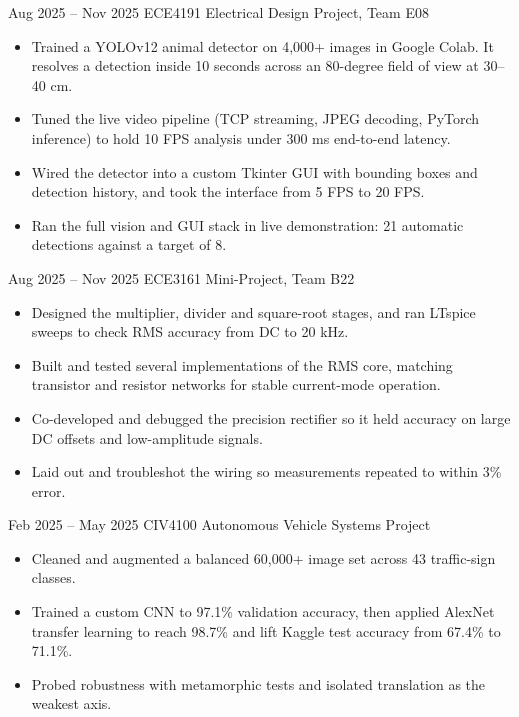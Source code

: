 {Aug 2025 -- Nov 2025}
{ECE4191 Electrical Design Project, Team E08}
{
\begin{itemize}
    \item Trained a YOLOv12 animal detector on 4,000+ images in Google Colab. It resolves a detection inside 10 seconds across an 80-degree field of view at 30--40 cm.
    \item Tuned the live video pipeline (TCP streaming, JPEG decoding, PyTorch inference) to hold 10 FPS analysis under 300 ms end-to-end latency.
    \item Wired the detector into a custom Tkinter GUI with bounding boxes and detection history, and took the interface from 5 FPS to 20 FPS.
    \item Ran the full vision and GUI stack in live demonstration: 21 automatic detections against a target of 8.
\end{itemize}
}

{Aug 2025 -- Nov 2025}
{ECE3161 Mini-Project, Team B22}
{
\begin{itemize}
    \item Designed the multiplier, divider and square-root stages, and ran LTspice sweeps to check RMS accuracy from DC to 20 kHz.
    \item Built and tested several implementations of the RMS core, matching transistor and resistor networks for stable current-mode operation.
    \item Co-developed and debugged the precision rectifier so it held accuracy on large DC offsets and low-amplitude signals.
    \item Laid out and troubleshot the wiring so measurements repeated to within 3\% error.
\end{itemize}
}

{Feb 2025 -- May 2025}
{CIV4100 Autonomous Vehicle Systems Project}
{
\begin{itemize}
    \item Cleaned and augmented a balanced 60,000+ image set across 43 traffic-sign classes.
    \item Trained a custom CNN to 97.1\% validation accuracy, then applied AlexNet transfer learning to reach 98.7\% and lift Kaggle test accuracy from 67.4\% to 71.1\%.
    \item Probed robustness with metamorphic tests and isolated translation as the weakest axis.
\end{itemize}
}

